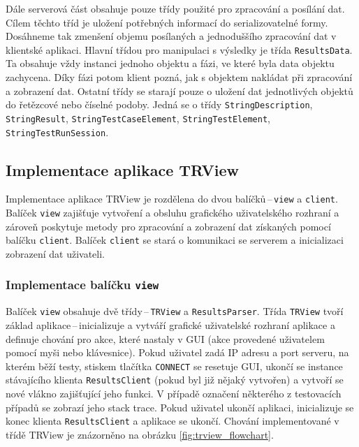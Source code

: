 	Dále serverová část obsahuje pouze třídy použité pro zpracování a posílání dat. Cílem těchto tříd je uložení potřebných informací do serializovatelné formy. Dosáhneme tak zmenšení objemu posílaných a jednoduššího zpracování dat v klientské aplikaci. Hlavní třídou pro manipulaci s výsledky je třída \texttt{ResultsData}. Ta obsahuje vždy instanci jednoho objektu a fázi, ve které byla data objektu zachycena. Díky fázi potom klient pozná, jak s objektem nakládat při zpracování a zobrazení dat. Ostatní třídy se starají pouze o uložení dat jednotlivých objektů do řetězcové nebo číselné podoby. Jedná se o třídy \texttt{StringDescription}, \texttt{StringResult}, \texttt{StringTestCaseElement}, \texttt{StringTestElement}, \texttt{StringTestRunSession}.

    \subsection{Implementace aplikace TRView}
    Implementace aplikace TRView je rozdělena do dvou balíčků\,--\,\texttt{view} a \texttt{client}. Balíček \texttt{view} zajišťuje vytvoření a obsluhu grafického uživatelského rozhraní a zároveň poskytuje metody pro zpracování a zobrazení dat získaných pomocí balíčku \texttt{client}. Balíček \texttt{client} se stará o komunikaci se serverem a inicializaci zobrazení dat uživateli. 
    
      \subsubsection{Implementace balíčku \texttt{view}}
      Balíček \texttt{view} obsahuje dvě třídy\,--\,\texttt{TRView} a \texttt{ResultsParser}. Třída \texttt{TRView} tvoří základ aplikace\,--\,inicializuje a vytváří grafické uživatelské rozhraní aplikace a definuje chování pro akce, které nastaly v GUI (akce provedené uživatelem pomocí myši nebo klávesnice). Pokud uživatel zadá IP adresu a port serveru, na kterém běží testy, stiskem tlačítka \texttt{CONNECT} se resetuje GUI, ukončí se instance stávajícího klienta \texttt{ResultsClient} (pokud byl již nějaký vytvořen) a vytvoří se nové vlákno zajišťující jeho funkci. V případě označení některého z testovacích případů se zobrazí jeho stack trace. Pokud uživatel ukončí aplikaci, inicializuje se konec klienta \texttt{ResultsClient} a aplikace se ukončí. Chování implementované v třídě TRView je znázorněno na obrázku \ref{fig:trview_flowchart}.\\
      
